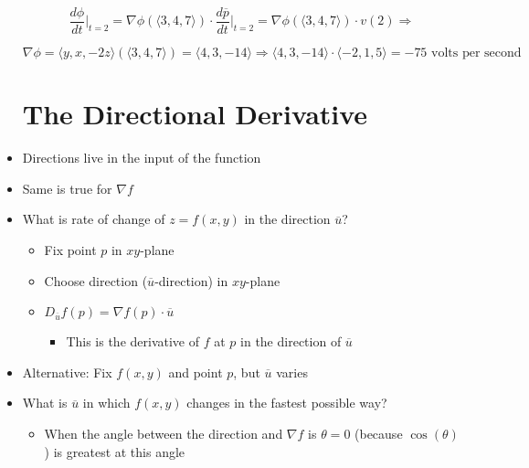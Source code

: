 \begin{itemize}
    $$\dfrac{d\phi}{dt}\Big|_{t=2}=\nabla \phi(\langle 3, 4, 7 \rangle)\cdot \dfrac{d\overline{p}}{dt}\Big|_{t=2}= \nabla \phi(\langle 3, 4, 7 \rangle)\cdot v(2)\Rightarrow$$

    $$\nabla \phi = \langle y, x, -2z \rangle(\langle 3, 4, 7 \rangle) = \langle 4, 3, -14 \rangle \Rightarrow \langle 4, 3, -14 \rangle \cdot \langle -2, 1, 5 \rangle = -75 \text{ volts per second}$$

    \section{The Directional Derivative}

  \item Directions live in the input of the function

  \item Same is true for $\nabla f$

  \item What is rate of change of $z=f(x,y)$ in the direction $\overline{u}$?

    \begin{itemize}

      \item Fix point $p$ in $xy$-plane

      \item Choose direction ($\overline{u}$-direction) in $xy$-plane

      \item $D_{\overline{u}}f(p) = \nabla f(p)\cdot\overline{u}$

        \begin{itemize}

          \item This is the derivative of $f$ at $p$ in the direction of $\overline{u}$

        \end{itemize}

    \end{itemize}

  \item Alternative: Fix $f(x,y)$ and point $p$, but $\overline{u}$ varies

  \item What is $\overline{u}$ in which $f(x,y)$ changes in the fastest possible way?

    \begin{itemize}

      \item When the angle between the direction and $\nabla f$ is $\theta = 0$ (because $\cos(\theta)$) is greatest at this angle


\end{itemize}
\end{itemize}
